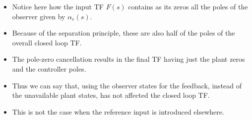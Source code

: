 \begin{itemize}
	\item Notice here how the input TF $F(s)$ contains as its zeros all the poles of the observer given by $\alpha_e(s)$.
	\item Because of the separation principle, these are also half of the poles of the overall closed loop TF.
	\item The pole-zero cancellation results in the final TF having just the plant zeros and the controller poles.
	\item Thus we can say that, using the observer states for the feedback, instead of the unavailable plant states, has not affected the closed loop TF.
	\item This is not the case when the reference input is introduced elsewhere.
\end{itemize}


\endinput

